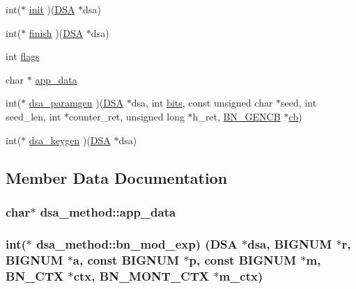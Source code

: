 \begin{DoxyCompactItemize}
\item 
int($\ast$ \hyperlink{structdsa__method_acfaf05310756308b9849f278cdfd91c6}{init} )(\hyperlink{ossl__typ_8h_aa26536f205a5c5f39111260bf246ed9d}{D\+SA} $\ast$dsa)
\item 
int($\ast$ \hyperlink{structdsa__method_aad9fed78046fe8c6f995ba9ee8bd59d2}{finish} )(\hyperlink{ossl__typ_8h_aa26536f205a5c5f39111260bf246ed9d}{D\+SA} $\ast$dsa)
\item 
int \hyperlink{structdsa__method_ae5a10b0b8d5b139e5818da8da5223ebc}{flags}
\item 
char $\ast$ \hyperlink{structdsa__method_a08528c35da49dcebc0675cb9b66bbeb9}{app\+\_\+data}
\item 
int($\ast$ \hyperlink{structdsa__method_a22d30cb3e62b00cbb818f7d2bacb99f7}{dsa\+\_\+paramgen} )(\hyperlink{ossl__typ_8h_aa26536f205a5c5f39111260bf246ed9d}{D\+SA} $\ast$dsa, int \hyperlink{x509v3_8h_ab3c186980893d6836a68407d221ae9c9}{bits}, const unsigned char $\ast$seed, int seed\+\_\+len, int $\ast$counter\+\_\+ret, unsigned long $\ast$h\+\_\+ret, \hyperlink{ossl__typ_8h_ae122a8be18f4fe821e5389381ececa09}{B\+N\+\_\+\+G\+E\+N\+CB} $\ast$\hyperlink{pem_8h_a92c578a1a1d2733de8cf205957a962fc}{cb})
\item 
int($\ast$ \hyperlink{structdsa__method_a55bf9cc2d75b43788806388a6e924eb1}{dsa\+\_\+keygen} )(\hyperlink{ossl__typ_8h_aa26536f205a5c5f39111260bf246ed9d}{D\+SA} $\ast$dsa)
\end{DoxyCompactItemize}


\subsection{Member Data Documentation}
\subsubsection[{\texorpdfstring{app\+\_\+data}{app_data}}]{\setlength{\rightskip}{0pt plus 5cm}char$\ast$ dsa\+\_\+method\+::app\+\_\+data}\hypertarget{structdsa__method_a08528c35da49dcebc0675cb9b66bbeb9}{}\label{structdsa__method_a08528c35da49dcebc0675cb9b66bbeb9}
\subsubsection[{\texorpdfstring{bn\+\_\+mod\+\_\+exp}{bn_mod_exp}}]{\setlength{\rightskip}{0pt plus 5cm}int($\ast$ dsa\+\_\+method\+::bn\+\_\+mod\+\_\+exp) ({\bf D\+SA} $\ast$dsa, {\bf B\+I\+G\+N\+UM} $\ast$r, {\bf B\+I\+G\+N\+UM} $\ast$a, const {\bf B\+I\+G\+N\+UM} $\ast$p, const {\bf B\+I\+G\+N\+UM} $\ast$m, {\bf B\+N\+\_\+\+C\+TX} $\ast$ctx, {\bf B\+N\+\_\+\+M\+O\+N\+T\+\_\+\+C\+TX} $\ast$m\+\_\+ctx)}\hypertarget{structdsa__method_afeec883c6d822b9faa7a03f2217fc651}{}\label{structdsa__method_afeec883c6d822b9faa7a03f2217fc651}
